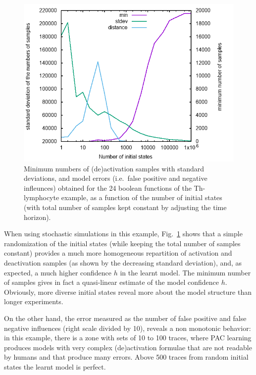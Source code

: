 \documentclass{llncs}
\begin{document}
\begin{figure}[htb]
   \includegraphics[width=\textwidth]{statistics/statistics.png}
   \caption{Minimum numbers of (de)activation samples with standard deviations, and model errors (i.e.~false positive and negative infleunces) obtained for the 24 boolean functions of the Th-lymphocyte example, as a function of the number of initial states 
(with total number of samples kept constant by adjusting the time horizon).}
\label{fig:statistics}
\end{figure}

When using stochastic simulations in this example, Fig.~\ref{fig:statistics} shows that a simple randomization of
the initial states (while keeping the total number of samples constant)
provides a much more homogeneous repartition of activation and deactivation samples (as shown by the
decreasing standard deviation), and, as expected, a much higher confidence $h$ in the learnt model.
The minimum number of samples gives in fact a quasi-linear estimate of the model confidence $h$.
Obviously, more diverse initial states reveal more about the model structure than longer experiments.

On the other hand, the error measured as the number of false positive and false negative influences (right scale divided by 10), reveals a non monotonic behavior:
in this example, there is a zone with sets of 10 to 100 traces, where PAC learning produces
models with very complex (de)activation formulae that are not readable by humans and that produce many errors.
Above 500 traces from random initial states the learnt model is perfect.
\end{document}
